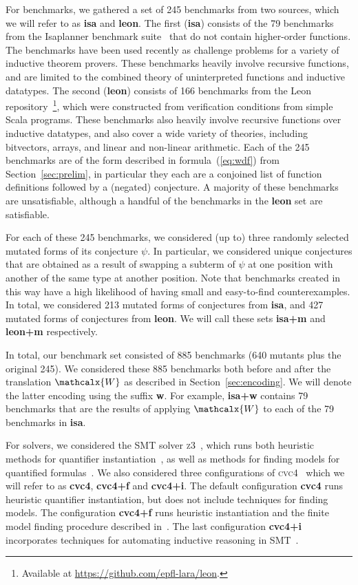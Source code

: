 \documentclass[runningheads,a4paper]{llncs}
\newcommand{\cvc}{\textsc{cvc}{\small 4}\xspace}
\newcommand{\ziii}{\textsc{z}{\small 3}\xspace}
\newcommand{\conv}{\mathcalx{W}}
\begin{document}
For benchmarks, we gathered a set of 245 benchmarks from two sources, which we will refer to as {\bf isa} and {\bf leon}.
The first ({\bf isa}) consists of the 79 benchmarks from the Isaplanner benchmark suite~\cite{DBLP:conf/itp/JohanssonDB10} that do not contain higher-order functions.
The benchmarks have been used recently as challenge problems for a variety of inductive theorem provers.
These benchmarks heavily involve recursive functions, and are limited to the combined theory of uninterpreted functions and inductive datatypes.
The second ({\bf leon}) consists of 166 benchmarks from the Leon repository~\footnote{Available at \url{https://github.com/epfl-lara/leon}.},
which were constructed from verification conditions from simple Scala programs.
These benchmarks also heavily involve recursive functions over inductive datatypes, 
and also cover a wide variety of theories, including bitvectors, arrays, and linear and non-linear arithmetic.
Each of the 245 benchmarks are of the form described in formula~(\ref{eq:wdf}) from Section~\ref{sec:prelim},
in particular they each are a conjoined list of function definitions followed by a (negated) conjecture.
A majority of these benchmarks are unsatisfiable, although a handful of the benchmarks in the {\bf leon} set are satisfiable.

For each of these 245 benchmarks, we considered (up to) three randomly selected mutated forms of its conjecture $\psi$.
In particular, we considered unique conjectures that are obtained as a result of swapping a subterm of $\psi$ at one position
with another of the same type at another position.
Note that benchmarks created in this way have a high likelihood of having small and easy-to-find counterexamples.
In total, we considered 213 mutated forms of conjectures from {\bf isa}, and 427 mutated forms of conjectures from {\bf leon}.
We will call these sets {\bf isa+m} and {\bf leon+m} respectively.

In total, our benchmark set consisted of 885 benchmarks (640 mutants plus the original 245).
We considered these 885 benchmarks both before and after the translation $\conv$ as described in Section~\ref{sec:encoding}.
We will denote the latter encoding using the suffix {\bf w}.
For example, {\bf isa+w} contains 79 benchmarks that are the results of
applying $\conv$ to each of the 79 benchmarks in {\bf isa}.

For solvers, we considered the SMT solver \ziii~\cite{de-moura-bjoerner-2008}, 
which runs both heuristic methods for quantifier instantiation~\cite{DBLP:conf/cade/MouraB07},
as well as methods for finding models for quantified formulas~\cite{GeDeM-CAV-09}.
We also considered three configurations of \cvc~\cite{barrett-et-al-2011} which we will refer to as {\bf cvc4}, {\bf cvc4+f} and {\bf cvc4+i}.
The default configuration {\bf cvc4} runs heuristic quantifier instantiation, 
but does not include techniques for finding models.
The configuration {\bf cvc4+f} runs heuristic instantiation and the finite model finding procedure described in~\cite{ReyEtAl-1-RR-13, reynolds-et-al-2013}.
The last configuration {\bf cvc4+i} incorporates techniques for automating inductive reasoning in SMT~\cite{reynolds-kuncak-2015}.
\end{document}
